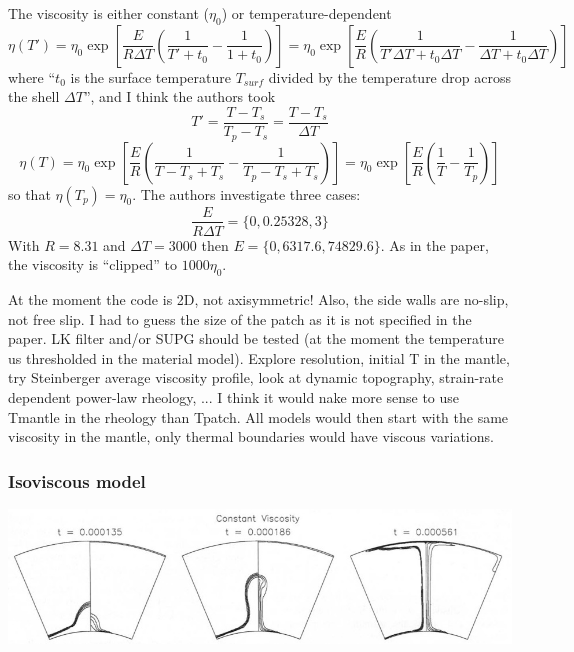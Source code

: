 The viscosity is either constant ($\eta_0$) or temperature-dependent 
\[
\eta(T')
=\eta_0 \exp\left[ \frac{E}{R \Delta T} \left( \frac{1}{T'+t_0} -\frac{1}{1+t_0}  \right)   \right]
=\eta_0 \exp\left[ \frac{E}{R} \left( \frac{1}{T' \Delta T  +t_0 \Delta T} -\frac{1}{\Delta T +t_0 \Delta T}  \right)   \right]
\]
where ``$t_0$ is the surface temperature $T_{surf}$ divided by 
the temperature drop across the shell $\Delta T$'', and 
I think the authors took 
\[
T'=\frac{T-T_s}{T_p-T_s}= \frac{T-T_s}{\Delta T}
\]
\[
\eta(T)
=\eta_0 \exp\left[ \frac{E}{R} \left( \frac{1}{T-T_s  + T_s} -\frac{1}{T_p-T_s + T_s}  \right)   \right]
=\eta_0 \exp\left[ \frac{E}{R} \left( \frac{1}{T} -\frac{1}{T_p}  \right)   \right]
\]
so that $\eta(T_p)=\eta_0$. 
The authors investigate three cases:
\[
\frac{E}{R \Delta T} = \{0,0.25328,3\}
\]
With $R=8.31$ and $\Delta T=3000$ then $E=\{ 0, 6317.6 , 74829.6 \}$.
As in the paper, the viscosity is ``clipped'' to $1000\eta_0$.

\begin{remark}
At the moment the code is 2D, not axisymmetric! Also, the side walls are no-slip, 
not free slip. I had to guess the size of the patch as it is not specified in the paper.
LK filter and/or SUPG should be tested (at the moment the temperature us thresholded in the 
material model). Explore resolution, initial T in the mantle, try Steinberger average 
viscosity profile, look at dynamic topography, strain-rate dependent power-law rheology, ...
I think it would nake more sense to use Tmantle in the rheology than Tpatch. All models would then start
with the same viscosity in the mantle, only thermal boundaries would have viscous variations.
\end{remark}


\subsubsection*{Isoviscous model}
\begin{center}
\includegraphics[width=15cm]{python_codes/fieldstone_106/images/keki97b}
\end{center}

